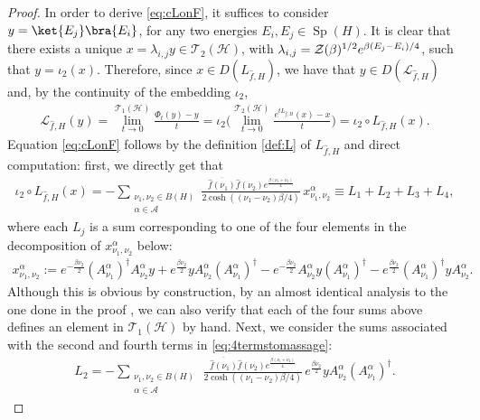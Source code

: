 \documentclass[11pt]{amsart}
\newcommand{\1}{\mathbbm{1}}
\theoremstyle{plain}
\theoremstyle{definition}
\theoremstyle{remark}
\numberwithin{equation}{section}
\begin{document}
\begin{proof}
In order to derive \eqref{eq:cLonF}, it suffices to consider $y=\ket{E_j}\bra{E_i}$, for any two energies $E_i,E_j\in\operatorname{Sp}(H)$. It is clear that there exists a unique $x=\lambda_{i,j}y\in\mathscr{T}_2(\mathcal{H})$, with $\lambda_{i,j}=\mathcal{Z}(\beta)^{1/2}e^{\smash{\beta(E_j-E_i)/4}}$, such that $y=\iota_2(x)$. Therefore, since $x\in D(L_{\widehat{f},H})$, we have that $y\in D(\mathcal{L}_{\widehat{f},H})$ and, by the continuity of the embedding $\iota_2$,
\begin{align*}
\mathcal{L}_{\widehat{f},H}(y)=\lim_{t\to 0}^{\mathscr{T}_1(\mathcal{H})}\frac{\Phi_t(y)-y}{t}=\iota_2\Big(\lim^{\mathscr{T}_2(\mathcal{H})}_{t\to 0}\frac{e^{tL_{\widehat{f},H}}(x)-x}{t}\Big)=\iota_2\circ L_{\widehat{f},H}(x).
\end{align*}
Equation \eqref{eq:cLonF} follows by the definition \eqref{def:L} of $L_{\widehat{f},H}$ and direct computation: first, we directly get that
\begin{align*}
\iota_2\circ L_{\widehat{f},H}(x)=-\sum_{\substack{\nu_1,\nu_2\in B(H)\\\alpha\in\mathcal{A}}}\frac{\overline{\widehat{f}(\nu_1)}\widehat{f}(\nu_2)e^{\frac{\beta(\nu_1+\nu_2)}{4}}}{2\cosh((\nu_1-\nu_2)\beta/4)}\,x^\alpha_{\nu_1,\nu_2}\equiv L_1+L_2+L_3+L_4,
\end{align*}
where each $L_j$ is a sum corresponding to one of the four elements in the decomposition of $x^\alpha_{\nu_1,\nu_2}$ below:
\begin{align}\label{eq:4termstomassage}
x^\alpha_{\nu_1,\nu_2}:=e^{-\frac{\beta\nu_2}{2}}(A^\alpha_{\nu_1})^\dagger A^\alpha_{\nu_2}y+e^{\frac{\beta\nu_2}{2}}yA^\alpha_{\nu_2}(A^\alpha_{\nu_1})^\dagger-e^{-\frac{\beta\nu_2}{2}}A^\alpha_{\nu_2}y(A^\alpha_{\nu_1})^\dagger-e^{\frac{\beta\nu_2}{2}}(A^\alpha_{\nu_1})^\dagger yA^\alpha_{\nu_2}.
\end{align}
Although this is obvious by construction, by an almost identical analysis to the one done in the proof , we can also verify that each of the four sums above defines an element in $\mathscr{T}_1(\mathcal{H})$ by hand. Next, we consider the sums associated with the second and fourth terms in \eqref{eq:4termstomassage}: 
\begin{align*}
L_2=-\sum_{\substack{\nu_1,\nu_2\in B(H)\\\alpha\in\mathcal{A}}}\,\frac{\overline{\widehat{f}(\nu_1)}\widehat{f}(\nu_2)e^{\frac{\beta(\nu_1+\nu_2)}{4}}}{2\cosh((\nu_1-\nu_2)\beta/4)}\,e^{\frac{\beta\nu_2}{2}}yA^\alpha_{\nu_2}(A^\alpha_{\nu_1})^\dagger.

\end{align*}
\end{proof}
\end{document}
